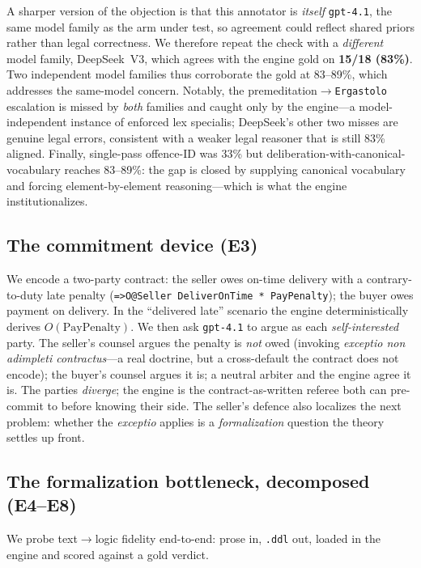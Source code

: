 A sharper version of the objection is that this annotator is \emph{itself} \texttt{gpt-4.1},
the same model family as the arm under test, so agreement could reflect shared priors rather
than legal correctness. We therefore repeat the check with a \emph{different} model family,
DeepSeek~V3, which agrees with the engine gold on \textbf{15/18 (83\%)}. Two independent model
families thus corroborate the gold at 83--89\%, which addresses the same-model concern. Notably,
the premeditation$\rightarrow$\texttt{Ergastolo} escalation is missed by \emph{both} families and
caught only by the engine---a model-independent instance of enforced lex specialis; DeepSeek's
other two misses are genuine legal errors, consistent with a weaker legal reasoner that is still
83\% aligned. Finally, single-pass offence-ID was 33\% but deliberation-with-canonical-vocabulary
reaches 83--89\%: the gap is closed by supplying canonical vocabulary and forcing
element-by-element reasoning---which is what the engine institutionalizes.

\subsection{The commitment device (E3)}
We encode a two-party contract: the seller owes on-time delivery with a contrary-to-duty
late penalty (\texttt{=>O@Seller DeliverOnTime * PayPenalty}); the buyer owes payment
on delivery. In the ``delivered late'' scenario the engine deterministically derives
$O(\text{PayPenalty})$. We then ask \texttt{gpt-4.1} to argue as each \emph{self-interested}
party. The seller's counsel argues the penalty is \emph{not} owed (invoking
\emph{exceptio non adimpleti contractus}---a real doctrine, but a cross-default the
contract does not encode); the buyer's counsel argues it is; a neutral arbiter and the
engine agree it is. The parties \emph{diverge}; the engine is the contract-as-written
referee both can pre-commit to before knowing their side. The seller's defence also
localizes the next problem: whether the \emph{exceptio} applies is a \emph{formalization}
question the theory settles up front.

\subsection{The formalization bottleneck, decomposed (E4--E8)}
We probe text$\rightarrow$logic fidelity end-to-end: prose in, \texttt{.ddl} out, loaded
in the engine and scored against a gold verdict.

